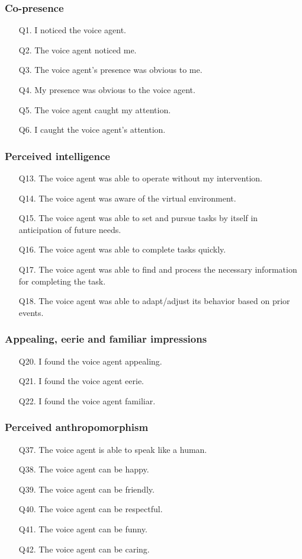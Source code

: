 \subsubsection*{Co-presence}
\begin{enumerate}
\item[Q1.] I noticed the voice agent.
\item[Q2.] The voice agent noticed me.
\item[Q3.] The voice agent's presence was obvious to me.
\item[Q4.] My presence was obvious to the voice agent.
\item[Q5.] The voice agent caught my attention.
\item[Q6.] I caught the voice agent's attention.
\end{enumerate}
\subsubsection*{Perceived intelligence}
\begin{enumerate}
\item[Q13.] The voice agent was able to operate without my intervention.
\item[Q14.] The voice agent was aware of the virtual environment.
\item[Q15.] The voice agent was able to set and pursue tasks by itself in anticipation of future needs.
\item[Q16.] The voice agent was able to complete tasks quickly.
\item[Q17.] The voice agent was able to find and process the necessary information for completing the task.
\item[Q18.] The voice agent was able to adapt/adjust its behavior based on prior events.
\end{enumerate}
\subsubsection*{Appealing, eerie and familiar impressions}
\begin{enumerate}
\item[Q20.] I found the voice agent appealing.
\item[Q21.] I found the voice agent eerie.
\item[Q22.] I found the voice agent familiar.
\end{enumerate}
\subsubsection*{Perceived anthropomorphism}
\begin{enumerate}
\item[Q37.] The voice agent is able to speak like a human.
\item[Q38.] The voice agent can be happy.
\item[Q39.] The voice agent can be friendly.
\item[Q40.] The voice agent can be respectful.
\item[Q41.] The voice agent can be funny.
\item[Q42.] The voice agent can be caring.
\end{enumerate}
